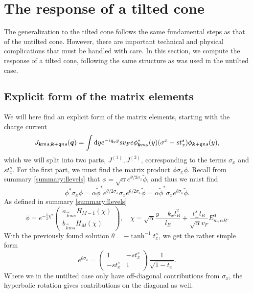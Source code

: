 \section{The response of a tilted cone}
The generalization to the tilted cone follows the same fundamental steps as that of the untilted cone.
However, there are important technical and physical complications that must be handled with care.
In this section, we compute the response of a tilted cone, following the same structure as was used in the untilted case.

\subsection{Explicit form of the matrix elements}\label{sec:explicit-form-tilt}
We will here find an explicit form of the matrix elements, starting with the charge current
\begin{equation}
  \label{eq:tilt:currentExpr}
  J_{\bm{k} m s; \bm{k}+\mathfrak{q} n s } (\bm{q}) = \int \mathrm{d}y e^{-i q_{y} y}
  s v_{F} e \phi ^{*}_{\bm{k} m s} (y) (\sigma^{x} + s t^s_x) \phi _{\bm{k} + \mathfrak{q} n s}(y),
\end{equation}
which we will split into two parts, \( J^{(1)}, J^{(2)} \), corresponding to the terms \( \sigma_x \) and \( s t^s_x \).
For the first part, we must find the matrix product \(\phi \sigma_{x} \phi \).
Recall from summary \ref{summary:llevels} that \(\phi = \sqrt{\alpha}  e^{\theta /2 \sigma _{x}} \tilde{\phi} \), and thus we must find
\[
  \phi ^{*} \sigma _{x} \phi
  = \alpha \tilde{\phi}^{*} e^{\theta /2 \sigma _{x}} \sigma _{x} e^{\theta /2 \sigma _{x}} \tilde{\phi}
  =  \alpha \tilde{\phi}^{*} \sigma _{x} e^{\theta \sigma _{x}} \tilde{\phi}.
\]
As defined in summary \ref{summary:llevels}
\[
  \tilde{\phi} = e^{-\frac{1}{2} \chi ^2}
  \begin{pmatrix}
    a_{\vec{k} m s} H_{M-1} (\chi)\\
    b_{\vec{k} m s} H_{M} (\chi)
  \end{pmatrix},\quad
  \chi = \sqrt{\alpha} \frac{ y - k_x l_B^2 }{l_{B}} + \frac{t_{\perp}^s l_B}{\sqrt{\alpha} v_{F}} E^0_{m, \alpha B}.
\]
With the previously found solution \(\theta = - \tanh ^{-1} t^s_{x}\), we get the rather simple form
\[
  e^{\theta \sigma _{x}} =
  \begin{pmatrix}
    1 & - s t^s_{x}\\
    -s t^s_{x} & 1
  \end{pmatrix}
  \frac{1}{\sqrt{1-t_{x}}}.
\]
Where we in the untilted case only have off-diagonal contributions from \( \sigma_x \), the hyperbolic rotation gives contributions on the diagonal as well.

